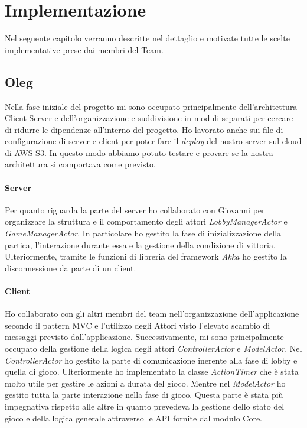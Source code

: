 \chapter{Implementazione}

Nel seguente capitolo verranno descritte nel dettaglio e motivate tutte le scelte implementative prese dai membri del Team.

\section{Oleg}

Nella fase iniziale del progetto mi sono occupato principalmente dell'architettura Client-Server e dell'organizzazione e suddivisione in moduli separati per cercare di ridurre le dipendenze all'interno del progetto.
Ho lavorato anche sui file di configurazione di server e client per poter
fare il \textit{deploy} del nostro server sul cloud di AWS S3. In questo modo abbiamo potuto testare e provare se la nostra architettura si comportava come previsto. 

\subsubsection{Server}
Per quanto riguarda la parte del server ho collaborato con Giovanni per organizzare la struttura e il comportamento degli attori \textit{LobbyManagerActor} e \textit{GameManagerActor}. In particolare ho gestito la fase di inizializzazione della partica, l'interazione durante essa e la gestione della condizione di vittoria. Ulteriormente, tramite le funzioni di libreria del framework \textit{Akka} ho gestito la disconnessione da parte di un client. 

\subsubsection{Client}
Ho collaborato con gli altri membri del team nell'organizzazione dell'applicazione secondo il pattern MVC e l'utilizzo degli Attori visto l'elevato scambio di messaggi previsto dall'applicazione.
Successivamente, mi sono principalmente occupato della gestione della logica degli attori \textit{ControllerActor} e \textit{ModelActor}. Nel \textit{ControllerActor} ho gestito la parte di comunicazione inerente alla fase di lobby e quella di gioco. Ulteriormente ho implementato la classe \textit{ActionTimer} che è stata molto utile per gestire le azioni a durata del gioco. Mentre nel \textit{ModelActor} ho gestito tutta la parte interazione nella fase di gioco. Questa parte è stata più impegnativa rispetto alle altre in quanto prevedeva la gestione dello stato del gioco e della logica generale attraverso le API fornite dal modulo Core. 


